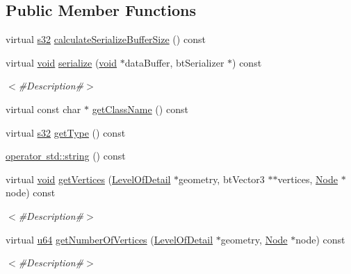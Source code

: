 \subsection*{Public Member Functions}
\begin{DoxyCompactItemize}
\item 
virtual \mbox{\hyperlink{_util_8h_aa62c75d314a0d1f37f79c4b73b2292e2}{s32}} \mbox{\hyperlink{classnjli_1_1_cube_a1e825a45f0d5562df188067854283d1b}{calculate\+Serialize\+Buffer\+Size}} () const
\item 
virtual \mbox{\hyperlink{_thread_8h_af1e856da2e658414cb2456cb6f7ebc66}{void}} \mbox{\hyperlink{classnjli_1_1_cube_a00652e991c099a535207194c73324c65}{serialize}} (\mbox{\hyperlink{_thread_8h_af1e856da2e658414cb2456cb6f7ebc66}{void}} $\ast$data\+Buffer, bt\+Serializer $\ast$) const
\begin{DoxyCompactList}\small\item\em $<$\#\+Description\#$>$ \end{DoxyCompactList}\item 
virtual const char $\ast$ \mbox{\hyperlink{classnjli_1_1_cube_ab6515dcb9f54a3bf9945dacbb88d2eca}{get\+Class\+Name}} () const
\item 
virtual \mbox{\hyperlink{_util_8h_aa62c75d314a0d1f37f79c4b73b2292e2}{s32}} \mbox{\hyperlink{classnjli_1_1_cube_ac5a367b969396afb5e7d060593ce67ab}{get\+Type}} () const
\item 
\mbox{\hyperlink{classnjli_1_1_cube_a1a9b42b50049c387b60043debda45961}{operator std\+::string}} () const
\item 
virtual \mbox{\hyperlink{_thread_8h_af1e856da2e658414cb2456cb6f7ebc66}{void}} \mbox{\hyperlink{classnjli_1_1_cube_a5379017996ff9b59a54253f75fac4409}{get\+Vertices}} (\mbox{\hyperlink{classnjli_1_1_level_of_detail}{Level\+Of\+Detail}} $\ast$geometry, bt\+Vector3 $\ast$$\ast$vertices, \mbox{\hyperlink{classnjli_1_1_node}{Node}} $\ast$node) const
\begin{DoxyCompactList}\small\item\em $<$\#\+Description\#$>$ \end{DoxyCompactList}\item 
virtual \mbox{\hyperlink{_util_8h_ad758b7a5c3f18ed79d2fcd23d9f16357}{u64}} \mbox{\hyperlink{classnjli_1_1_cube_a62a69318d5cb98a56f81f91968efcc8e}{get\+Number\+Of\+Vertices}} (\mbox{\hyperlink{classnjli_1_1_level_of_detail}{Level\+Of\+Detail}} $\ast$geometry, \mbox{\hyperlink{classnjli_1_1_node}{Node}} $\ast$node) const
\begin{DoxyCompactList}\small\item\em $<$\#\+Description\#$>$ \end{DoxyCompactList}\item 
$$
\end{DoxyCompactItemize}
